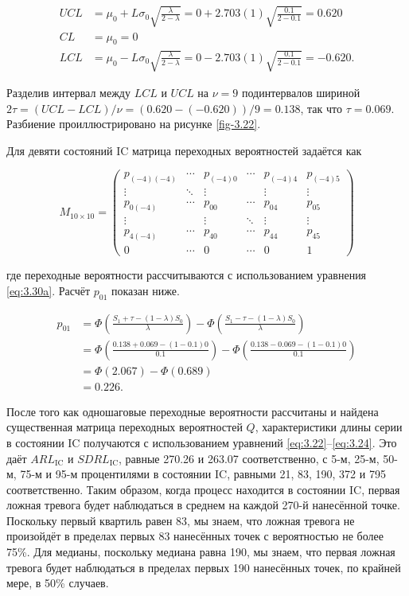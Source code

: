 \[
\begin{aligned}
UCL &= \mu_0 + L\sigma_0\sqrt{\frac{\lambda}{2 - \lambda}} = 0 + 2.703(1)\sqrt{\frac{0.1}{2 - 0.1}} = 0.620 \\
CL &= \mu_0 = 0 \\
LCL &= \mu_0 - L\sigma_0\sqrt{\frac{\lambda}{2 - \lambda}} = 0 - 2.703(1)\sqrt{\frac{0.1}{2 - 0.1}} = -0.620.
\end{aligned}
\]

Разделив интервал между \(LCL\) и \(UCL\) на \(\nu = 9\) подинтервалов шириной \(2\tau = (UCL - LCL)/\nu = (0.620 - (-0.620))/9 = 0.138\), так что \(\tau = 0.069\). Разбиение проиллюстрировано на рисунке \ref{fig-3.22}.

Для девяти состояний IC матрица переходных вероятностей задаётся как

\[
M_{10 \times 10} = \left( \begin{array}{cccccccccc}
p_{(-4)(-4)} & \cdots & p_{(-4)0} & \cdots & p_{(-4)4} & p_{(-4)5} \\
\vdots & \ddots & \vdots & & \vdots & \vdots \\
p_{0(-4)} & \cdots & p_{00} & \cdots & p_{04} & p_{05} \\
\vdots & & \vdots & \ddots & \vdots & \vdots \\
p_{4(-4)} & \cdots & p_{40} & \cdots & p_{44} & p_{45} \\
\hline
0 & \cdots & 0 & \cdots & 0 & 1
\end{array} \right)
\]

где переходные вероятности рассчитываются с использованием уравнения \eqref{eq:3.30a}. Расчёт \(p_{01}\) показан ниже.

\[
\begin{aligned}
p_{01} &= \Phi\left(\frac{S_1 + \tau - (1 - \lambda)S_0}{\lambda}\right) - \Phi\left(\frac{S_1 - \tau - (1 - \lambda)S_0}{\lambda}\right) \\
&= \Phi\left(\frac{0.138 + 0.069 - (1 - 0.1)0}{0.1}\right) - \Phi\left(\frac{0.138 - 0.069 - (1 - 0.1)0}{0.1}\right) \\
&= \Phi(2.067) - \Phi(0.689) \\
&= 0.226.
\end{aligned}
\]

После того как одношаговые переходные вероятности рассчитаны и найдена существенная матрица переходных вероятностей \(Q\), характеристики длины серии в состоянии IC получаются с использованием уравнений \eqref{eq:3.22}–\eqref{eq:3.24}. Это даёт \(ARL_{\text{IC}}\) и \(SDRL_{\text{IC}}\), равные 270.26 и 263.07 соответственно, с 5-м, 25-м, 50-м, 75-м и 95-м процентилями в состоянии IC, равными 21, 83, 190, 372 и 795 соответственно. Таким образом, когда процесс находится в состоянии IC, первая ложная тревога будет наблюдаться в среднем на каждой 270-й нанесённой точке. Поскольку первый квартиль равен 83, мы знаем, что ложная тревога не произойдёт в пределах первых 83 нанесённых точек с вероятностью не более 75\%. Для медианы, поскольку медиана равна 190, мы знаем, что первая ложная тревога будет наблюдаться в пределах первых 190 нанесённых точек, по крайней мере, в 50\% случаев.

